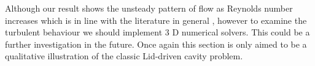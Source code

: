 Although our result shows the unsteady pattern of flow as Reynolds number increases which is in line with the literature in general \cite{botella1998benchmark, erturk2005numerical, bruneau20062d}, however to examine the turbulent behaviour we should implement 3 D numerical solvers. This could be a further investigation in the future. Once again this section is only aimed to be a qualitative illustration of the classic Lid-driven cavity problem. 